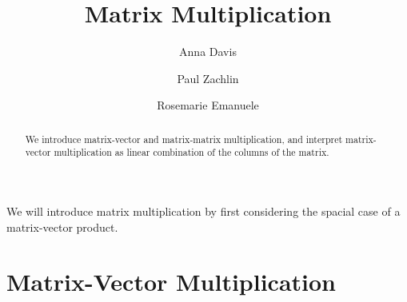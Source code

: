 \documentclass{ximera}
\author{Anna Davis \and Paul Zachlin \and Rosemarie Emanuele} \title{Matrix Multiplication} \license{CC-BY 4.0}
\begin{document}
\begin{abstract}
  We introduce matrix-vector and matrix-matrix multiplication, and interpret matrix-vector multiplication as linear combination of the columns of the matrix.
\end{abstract}
\maketitle


We will introduce matrix multiplication by first considering the spacial case of a matrix-vector product.

\section*{Matrix-Vector Multiplication}
\end{document}
